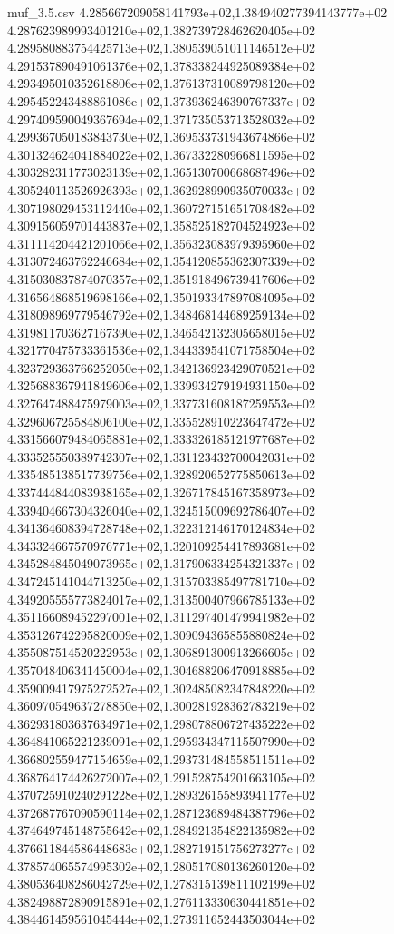 \begin{filecontents*}{muf_3.5.csv}
4.285667209058141793e+02,1.384940277394143777e+02
4.287623989993401210e+02,1.382739728462620405e+02
4.289580883754425713e+02,1.380539051011146512e+02
4.291537890491061376e+02,1.378338244925089384e+02
4.293495010352618806e+02,1.376137310089798120e+02
4.295452243488861086e+02,1.373936246390767337e+02
4.297409590049367694e+02,1.371735053713528032e+02
4.299367050183843730e+02,1.369533731943674866e+02
4.301324624041884022e+02,1.367332280966811595e+02
4.303282311773023139e+02,1.365130700668687496e+02
4.305240113526926393e+02,1.362928990935070033e+02
4.307198029453112440e+02,1.360727151651708482e+02
4.309156059701443837e+02,1.358525182704524923e+02
4.311114204421201066e+02,1.356323083979395960e+02
4.313072463762246684e+02,1.354120855362307339e+02
4.315030837874070357e+02,1.351918496739417606e+02
4.316564868519698166e+02,1.350193347897084095e+02
4.318098969779546792e+02,1.348468144689259134e+02
4.319811703627167390e+02,1.346542132305658015e+02
4.321770475733361536e+02,1.344339541071758504e+02
4.323729363766252050e+02,1.342136923429070521e+02
4.325688367941849606e+02,1.339934279194931150e+02
4.327647488475979003e+02,1.337731608187259553e+02
4.329606725584806100e+02,1.335528910223647472e+02
4.331566079484065881e+02,1.333326185121977687e+02
4.333525550389742307e+02,1.331123432700042031e+02
4.335485138517739756e+02,1.328920652775850613e+02
4.337444844083938165e+02,1.326717845167358973e+02
4.339404667304326040e+02,1.324515009692786407e+02
4.341364608394728748e+02,1.322312146170124834e+02
4.343324667570976771e+02,1.320109254417893681e+02
4.345284845049073965e+02,1.317906334254321337e+02
4.347245141044713250e+02,1.315703385497781710e+02
4.349205555773824017e+02,1.313500407966785133e+02
4.351166089452297001e+02,1.311297401479941982e+02
4.353126742295820009e+02,1.309094365855880824e+02
4.355087514520222953e+02,1.306891300913266605e+02
4.357048406341450004e+02,1.304688206470918885e+02
4.359009417975272527e+02,1.302485082347848220e+02
4.360970549637278850e+02,1.300281928362783219e+02
4.362931803637634971e+02,1.298078806727435222e+02
4.364841065221239091e+02,1.295934347115507990e+02
4.366802559477154659e+02,1.293731484558511511e+02
4.368764174426272007e+02,1.291528754201663105e+02
4.370725910240291228e+02,1.289326155893941177e+02
4.372687767090590114e+02,1.287123689484387796e+02
4.374649745148755642e+02,1.284921354822135982e+02
4.376611844586448683e+02,1.282719151756273277e+02
4.378574065574995302e+02,1.280517080136260120e+02
4.380536408286042729e+02,1.278315139811102199e+02
4.382498872890915891e+02,1.276113330630441851e+02
4.384461459561045444e+02,1.273911652443503044e+02

\end{filecontents*}
